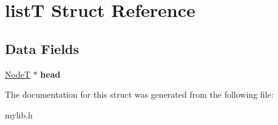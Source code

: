 \hypertarget{structlist_t}{}\section{listT Struct Reference}
\label{structlist_t}
\subsection*{Data Fields}
\begin{DoxyCompactItemize}
\item 
\mbox{\label{structlist_t_ade12b0b627d6007bfcb02bbc055c5ed0}} 
\mbox{\hyperlink{structnode_t}{NodeT}} $\ast$ {\bfseries head}
\end{DoxyCompactItemize}


The documentation for this struct was generated from the following file\+:\begin{DoxyCompactItemize}
\item 
mylib.\+h\end{DoxyCompactItemize}
